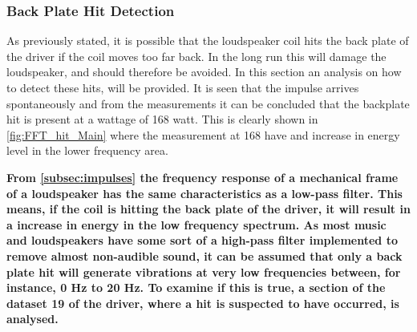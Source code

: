 \subsubsection{Back Plate Hit Detection}\label{sec:hit_detect}

As previously stated, it is possible that the loudspeaker coil hits the back plate of the driver if the coil moves too far back. In the long run this will damage the loudspeaker, and should therefore be avoided. In this section an analysis on how to detect these hits, will be provided. It is seen that the impulse arrives spontaneously and from the measurements it can be concluded that the backplate hit is present at a wattage of 168 watt. This is clearly shown in \autoref{fig:FFT_hit_Main} where the measurement at 168 have and increase in energy level in the lower frequency area.

\textbf{From \autoref{subsec:impulses} the frequency response of a mechanical frame of a loudspeaker has the same characteristics as a low-pass filter. This means, if the coil is hitting the back plate of the driver, it will result in a increase in energy in the low frequency spectrum. As most music and loudspeakers have some sort of a high-pass filter implemented to remove almost non-audible sound, it can be assumed that only a back plate hit will generate vibrations at very low frequencies between, for instance, 0 Hz to 20 Hz. To examine if this is true, a section of the dataset 19 of the driver, where a hit is suspected to have occurred, is analysed.} %


%	
%	

